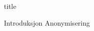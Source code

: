 \documentclass{article}
\begin{document}
{title}

\tableofcontents

\listoffigures

\listoftables

\mainmatter
{Introduksjon}
{Anonymisering}

\newpage
\nocite{PCP,wiki:FaceDetection}

\end{document}
